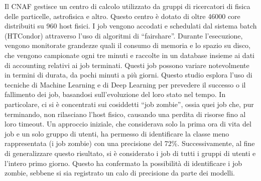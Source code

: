 Il CNAF gestisce un centro di calcolo utilizzato da gruppi di ricercatori di
fisica delle particelle, astrofisica e altro.
Questo centro è dotato di oltre 46000 core distribuiti
su 960 host fisici. I job vengono accodati e schedulati dal sistema batch
(HTCondor) attraverso l'uso di algoritmi di ``fairshare''.
Durante l'esecuzione, vengono monitorate grandezze quali il consumo di memoria
e lo spazio su disco, che vengono campionate ogni tre minuti e raccolte in un
database insieme ai dati di accounting relativi ai job terminati.
Questi job possono variare notevolmente in termini di durata, da pochi minuti
a più giorni.
Questo studio esplora l'uso di tecniche di Machine Learning e di Deep Learning
per prevedere il successo o il fallimento dei job, basandosi sull'evoluzione
del loro stato nel tempo.
In particolare, ci si è concentrati sui cosiddetti ``job zombie'', ossia quei
job che, pur terminando, non rilasciano l'host fisico, causando una perdita di
risorse fino al loro timeout.
Un approccio iniziale, che considerava solo la prima ora di vita del job e un
solo gruppo di utenti, ha
permesso di identificare la classe meno rappresentata (i job zombie) con
una precisione del 72\%.
Successivamente, al fine di generalizzare questo risultato, si è considerato i
job di tutti i gruppi di utenti e l'intero primo giorno. Questo ha confermato
la possibilità di identificare i job zombie, sebbene si sia registrato un calo
di precisione da parte dei modelli.
